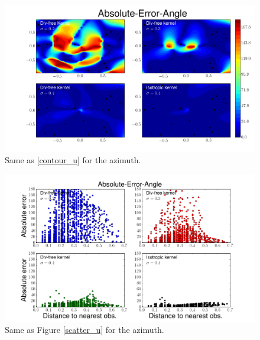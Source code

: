 \documentclass[12pt,a4paper]{article}%
\begin{document}
\begin{figure}
\noindent\includegraphics[width=32pc]{plots/Absolute-Error-Angle-contour.png}
\caption{Same as \ref{contour_u} for the azimuth. }
\label{contour_angle}
\end{figure}

\begin{figure}
\noindent\includegraphics[width=32pc]{plots/Absolute-Error-Angle-scatter.png}
\caption{Same as Figure \ref{scatter_u} for the azimuth. }
\label{scatter_angle}
\end{figure}
\end{document}
